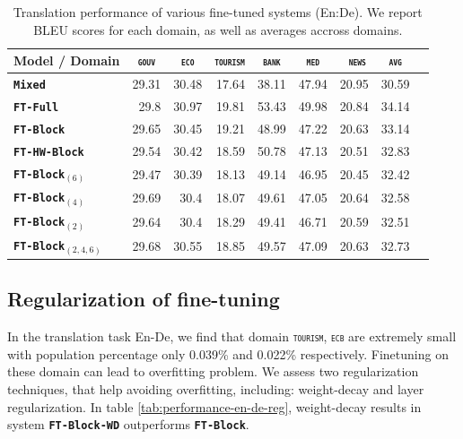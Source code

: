 \documentclass[11pt,a4paper]{article}
\newcommand{\fyTodo}[1]{\Todo[FY:]{\textcolor{orange}{#1}}}
\newcommand{\fyDone}[1]{\done[FY]\Todo[FY:]{\textcolor{orange}{#1}}}
\newcommand{\domain}[1]{\texttt{\textsc{#1}}}
\newcommand{\system}[1]{\texttt{\textbf{#1}}}
\begin{document}
\begin{table}[htbp]
  \centering
  \fyDone{Fix column size}
  \begin{tabular}{|p{3cm}|*{8}{r|}} \hline
    Model / Domain & \multicolumn{1}{c|}{\domain{gouv}} & \multicolumn{1}{c|}{\domain{eco}} & \multicolumn{1}{c|}{\domain{tourism}} & \multicolumn{1}{c|}{\domain{bank}} & \multicolumn{1}{c|}{\domain{ med }} & \multicolumn{1}{c|}{\domain{ news}} & \multicolumn{1}{c|}{\domain{avg}} \\ \hline %
    \system{Mixed}  & 29.31 & 30.48 & 17.64 & 38.11 & 47.94 & 20.95  & 30.59 \\
    \system{FT-Full}       & 29.8 & 30.97 & 19.81 & 53.43 & 49.98 & 20.84 & 34.14 \\
   \system{FT-Block}     & 29.65 & 30.45 & 19.21 & 48.99 & 47.22 & 20.63 & 33.14 \\ 
   \system{FT-HW-Block}   & 29.54 & 30.42 & 18.59 & 50.78 & 47.13 & 20.51 & 32.83 \\ 
   \system{FT-Block$_{(6)}$}     & 29.47 & 30.39 & 18.13 & 49.14 & 46.95 & 20.45 & 32.42 \\
   \system{FT-Block$_{(4)}$}     & 29.69 & 30.4 & 18.07 & 49.61 & 47.05 & 20.64 & 32.58 \\
   \system{FT-Block$_{(2)}$}   & 29.64 & 30.4 & 18.29 & 49.41 & 46.71 & 20.59 & 32.51  \\
   \system{FT-Block$_{(2,4,6)}$}  & 29.68  & 30.55 & 18.85 & 49.57 & 47.09 & 20.63 &  32.73  \\
     \hline
  \end{tabular}
  \caption{Translation performance of various fine-tuned systems (En:De). We report BLEU scores for each domain, as well as averages accross domains.}
  \label{tab:performance-en-de}
\end{table}

\fyTodo{Why HW worse than standard version ?} \fyTodo{Why is regularization not helping ?}
\subsection{Regularization of fine-tuning}
In the translation task En-De, we find that domain \domain{tourism}, \domain{ecb} are extremely small with population percentage only 0.039\% and 0.022\% respectively. Finetuning on these domain can lead to overfitting problem. We assess two regularization techniques, that help avoiding overfitting, including: weight-decay and layer regularization. In table \ref{tab:performance-en-de-reg}, weight-decay results in system \system{FT-Block-WD} outperforms \system{FT-Block}. 
\end{document}
